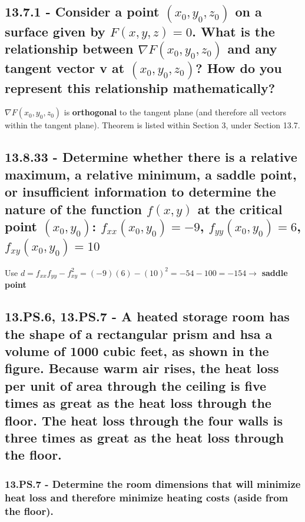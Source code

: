 \documentclass{article}
\begin{document}
\subsection{13.7.1 - Consider a point $(x_{0}, y_{0}, z_{0})$ on a surface given by $F(x, y, z) = 0$.  What is the relationship between $\nabla F(x_{0}, y_{0}, z_{0})$ and any tangent vector \textbf{v} at $(x_{0}, y_{0}, z_{0})$?  How do you represent this relationship mathematically?}

\par\noindent\large $\nabla F(x_{0}, y_{0}, z_{0})$ is \textbf{orthogonal} to the tangent plane (and therefore all vectors within the tangent plane).  Theorem is listed within Section 3, under Section 13.7.

\subsection{13.8.33 - Determine whether there is a relative maximum, a relative minimum, a saddle point, or insufficient information to determine the nature of the function $f(x, y)$ at the critical point $(x_{0}, y_{0})$: $f_{xx}(x_{0}, y_{0}) = -9$, $f_{yy}(x_{0}, y_{0}) = 6$, $f_{xy}(x_{0}, y_{0}) = 10$ }

\par\noindent\large Use $d = f_{xx}f_{yy} - f_{xy}^{2} = (-9)(6) - (10)^{2} = -54 - 100 = -154 \rightarrow$ \textbf{saddle point}

\subsection{13.PS.6, 13.PS.7 - A heated storage room has the shape of a rectangular prism and hsa a volume of 1000 cubic feet, as shown in the figure.  Because warm air rises, the heat loss per unit of area through the ceiling is five times as great as the heat loss through the floor.  The heat loss through the four walls is three times as great as the heat loss through the floor.}

\subsubsection{13.PS.7 - Determine the room dimensions that will minimize heat loss and therefore minimize heating costs (aside from the floor).}
\end{document}

